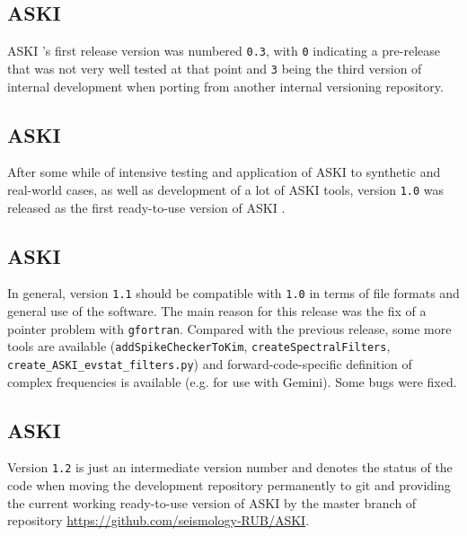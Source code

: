 \documentclass[12pt,a4paper]{article}
\newcommand{\lcode}[1]{\nolinkurl{#1}}
\newcommand{\lcodetitle}[1]{ {\ttfamily #1} }
\newcommand{\ASKI}{ {\ttfamily ASKI} }
\begin{document}
\subsection*{\ASKI{} \lcodetitle{0.3}}
\ASKI{}'s first release version was numbered \lcode{0.3}, with \lcode{0} indicating a pre-release
that was not very well tested at that point and \lcode{3} being the third version of internal
development when porting from another internal versioning repository.

\subsection*{\ASKI{} \lcodetitle{1.0}}
After some while of intensive testing and application of \ASKI{} to synthetic and real-world cases, 
as well as development of a lot of \ASKI{} tools, version \lcode{1.0} was released as the first
ready-to-use version of \ASKI{}.

\subsection*{\ASKI{} \lcodetitle{1.1}}
In general, version \lcode{1.1} should be compatible with \lcode{1.0} in terms of file formats and general use
of the software. The main reason for this release was the fix of a pointer problem with \lcode{gfortran}.
Compared with the previous release, some more tools are available (\lcode{addSpikeCheckerToKim}, 
\lcode{createSpectralFilters}, \lcode{create_ASKI_evstat_filters.py}) and forward-code-specific 
definition of complex frequencies is available (e.g. for use with Gemini). Some bugs were fixed.

\subsection*{\ASKI{} \lcodetitle{1.2}}
Version \lcode{1.2} is just an intermediate version number and denotes the status of the code when moving the 
development repository permanently to git and providing the current working ready-to-use version of \ASKI{} by the 
master branch of repository \url{https://github.com/seismology-RUB/ASKI}.
\end{document}
